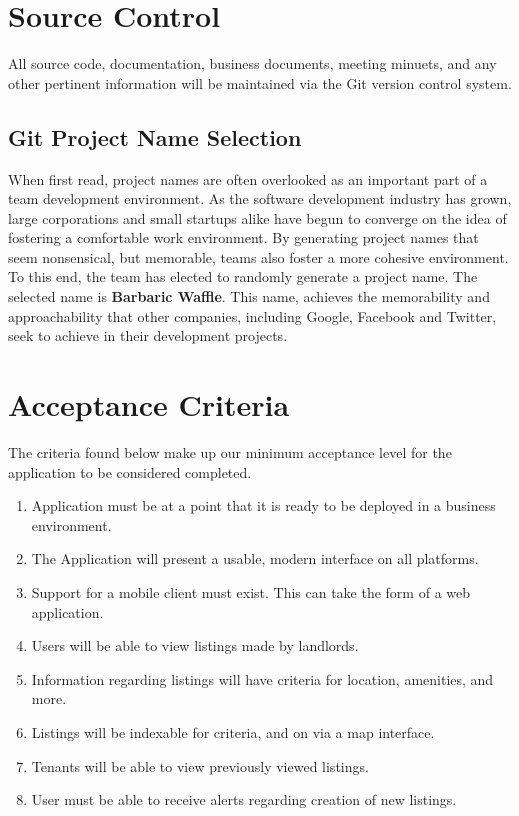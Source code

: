 \documentclass[]{article}
\begin{document}
\section{Source Control}
All source code, documentation, business documents, meeting minuets, and any other pertinent information will be maintained via the Git version control system.
\subsection{Git Project Name Selection}
When first read, project names are often overlooked as an important part of a team development environment. As the software development industry has grown, large corporations and small startups alike have begun to converge on the idea of fostering a comfortable work environment. By generating project names that seem nonsensical, but memorable, teams also foster a more cohesive environment. To this end, the team has elected to randomly generate a project name. The selected name is \textbf{Barbaric Waffle}. This name, achieves the memorability and approachability that other companies, including Google, Facebook and Twitter, seek to achieve in their development projects.

\section{Acceptance Criteria}
The criteria found below make up our minimum acceptance level for the application to be considered completed.
\begin{enumerate}
	\item Application must be at a point that it is ready to be deployed in a business environment.
	\item The Application will present a usable, modern interface on all platforms.
	\item Support for a mobile client must exist. This can take the form of a web application.
	\item Users will be able to view listings made by landlords.
	\item Information regarding listings will have criteria for location, amenities, and more.
	\item Listings will be indexable for criteria, and on via a map interface.
	\item Tenants will be able to view previously viewed listings.
	\item User must be able to receive alerts regarding creation of new listings.
\end{enumerate}
\end{document}
